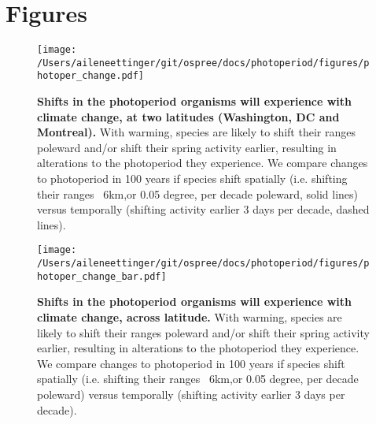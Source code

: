 \documentclass{article}
\begin{document}
\section* {Figures}
\begin{figure}[p]
\centering
\texttt{[image: /Users/aileneettinger/git/ospree/docs/photoperiod/figures/photoper\_change.pdf]} 
\caption{\textbf{Shifts in the photoperiod organisms will experience with climate change, at two latitudes (Washington, DC and Montreal).}  With warming, species are likely to shift their ranges poleward and/or shift their spring activity earlier, resulting in alterations to the photoperiod they experience. We compare changes to photoperiod in 100 years if species shift spatially (i.e. shifting their ranges ~6km,or 0.05 degree, per decade poleward, solid lines) versus temporally (shifting activity earlier 3 days per decade, dashed lines).}
 \label{fig:photo}
 \end{figure}
\begin{figure}[p]
\centering
\texttt{[image: /Users/aileneettinger/git/ospree/docs/photoperiod/figures/photoper\_change\_bar.pdf]} 
\caption{\textbf{Shifts in the photoperiod organisms will experience with climate change, across latitude.}  With warming, species are likely to shift their ranges poleward and/or shift their spring activity earlier, resulting in alterations to the photoperiod they experience. We compare changes to photoperiod in 100 years if species shift spatially (i.e. shifting their ranges ~6km,or 0.05 degree, per decade poleward) versus temporally (shifting activity earlier 3 days per decade).}
 \label{fig:photo_bar}%
 \end{figure}
\clearpage



\end{document}
